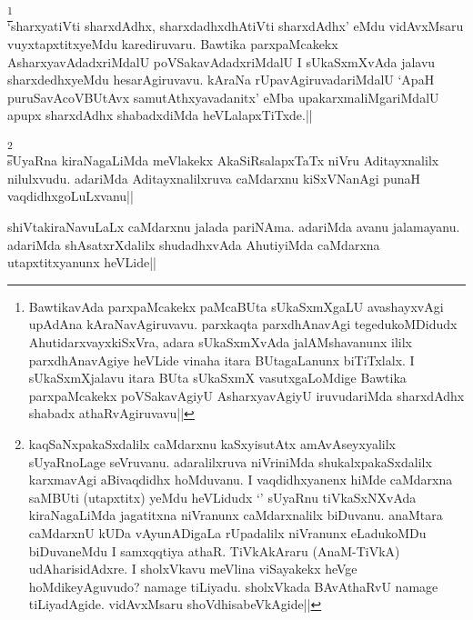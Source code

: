 \begin{artha}
\footnote[1]{BawtikavAda parxpaMcakekx paMcaBUta sUkaSxmXgaLU 
avashayxvAgi upAdAna kAraNavAgiruvavu. parxkaqta parxdhAnavAgi 
tegedukoMDidudx AhutidarxvayxkiSxVra, adara sUkaSxmXvAda 
jalAMshavanunx ililx parxdhAnavAgiye heVLide vinaha itara BUtagaLanunx 
biTiTxlalx. I sUkaSxmXjalavu itara BUta sUkaSxmX vasutxgaLoMdige 
Bawtika parxpaMcakekx poVSakavAgiyU AsharxyavAgiyU iruvudariMda 
sharxdAdhx shabadx athaRvAgiruvavu||}\\
`sharxyatiVti sharxdAdhx, sharxdadhxdhAtiVti sharxdAdhx' eMdu 
vidAvxMsaru vuyxtapxtitxyeMdu karediruvaru. Bawtika parxpaMcakekx 
AsharxyavAdadxriMdalU poVSakavAdadxriMdalU I sUkaSxmXvAda jalavu 
sharxdedhxyeMdu hesarAgiruvavu. kAraNa rUpavAgiruvadariMdalU `ApaH 
puruSavAcoVBUtAvx samutAthxyavadanitx' eMba upakarxmaliMgariMdalU 
apupx sharxdAdhx shabadxdiMda heVLalapxTiTxde.|| 
\end{artha}


\begin{artha}
\footnote[1]{kaqSaNxpakaSxdalilx caMdarxnu kaSxyisutAtx 
amAvAseyxyalilx sUyaRnoLage seVruvanu. adaralilxruva niVriniMda 
shukalxpakaSxdalilx karxmavAgi aBivaqdidhx hoMduvanu. I vaqdidhxyanenx 
hiMde caMdarxna saMBUti (utapxtitx) yeMdu heVLidudx `\stext' sUyaRnu 
tiVkaSxNXvAda kiraNagaLiMda jagatitxna niVranunx caMdarxnalilx 
biDuvanu. anaMtara caMdarxnU kUDa vAyunADigaLa rUpadalilx niVranunx 
eLadukoMDu biDuvaneMdu I samxqqtiya athaR. TiVkAkAraru (AnaM-TiVkA) 
udAharisidAdxre. I sholxVkavu meVlina viSayakekx heVge 
hoMdikeyAguvudo? namage tiLiyadu. sholxVkada BAvAthaRvU namage 
tiLiyadAgide. vidAvxMsaru shoVdhisabeVkAgide||}\\
sUyaRna kiraNagaLiMda meVlakekx AkaSiRsalapxTaTx niVru Aditayxnalilx 
nilulxvudu. adariMda Aditayxnalilxruva caMdarxnu kiSxVNanAgi punaH 
vaqdidhxgoLuLxvanu||
\end{artha}


\begin{artha}
shiVtakiraNavuLaLx caMdarxnu jalada pariNAma. adariMda avanu 
jalamayanu. adariMda shAsatxrXdalilx shudadhxvAda AhutiyiMda caMdarxna 
utapxtitxyanunx heVLide||
\end{artha}


